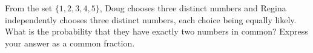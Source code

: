 From the set $\{1,2,3,4,5\}$, Doug chooses three distinct numbers and Regina independently chooses three distinct numbers, each choice being equally likely. What is the probability that they have exactly two numbers in common? Express your answer as a common fraction.
